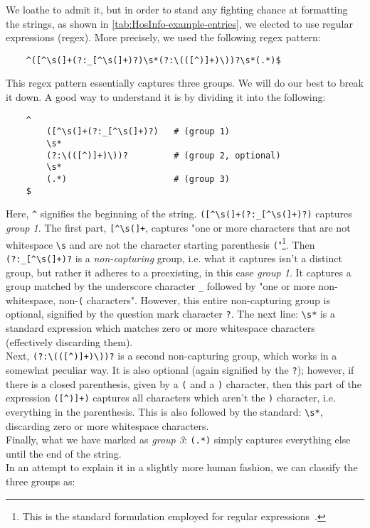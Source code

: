We loathe to admit it, but in order to stand any fighting chance at formatting the strings, as shown in \autoref{tab:HosInfo-example-entries}, we elected to use regular expressions (regex). More precisely, we used the following regex pattern:
\begin{verbatim}
    ^([^\s(]+(?:_[^\s(]+)?)\s*(?:\(([^)]+)\))?\s*(.*)$
\end{verbatim}
This regex pattern essentially captures three groups. We will do our best to break it down. A good way to understand it is by dividing it into the following:
\begin{verbatim}
    ^
        ([^\s(]+(?:_[^\s(]+)?)   # (group 1)
        \s*
        (?:\(([^)]+)\))?         # (group 2, optional)
        \s*
        (.*)                     # (group 3)
    $
\end{verbatim}
Here, \verb|^| signifies the beginning of the string. \verb|([^\s(]+(?:_[^\s(]+)?)| captures \emph{group 1}. The first part, \verb|[^\s(]+|, captures "one or more characters that are not whitespace \verb|\s| and are not the character starting parenthesis \verb|(|"\footnote{This is the standard formulation employed for regular expressions~\cite{Original-RegEx}.}. Then \verb|(?:_[^\s(]+)?| is a \emph{non-capturing} group, i.e. what it captures isn't a distinct group, but rather it adheres to a preexisting, in this case \emph{group 1}. It captures a group matched by the underscore character \verb|_| followed by "one or more non-whitespace, non-\verb|(| characters". However, this entire non-capturing group is optional, signified by the question mark character \verb|?|. The next line: \verb|\s*| is a standard expression which matches zero or more whitespace characters (effectively discarding them).
\\
Next, \verb|(?:\(([^)]+)\))?| is a second non-capturing group, which works in a somewhat peculiar way. It is also optional (again signified by the \verb|?|); however, if there is a closed parenthesis, given by a \verb|(| and a \verb|)| character, then this part of the expression \verb|([^)]+)| captures all characters which aren't the \verb|)| character, i.e. everything in the parenthesis. This is also followed by the standard: \verb|\s*|, discarding zero or more whitespace characters.
\\
Finally, what we have marked as \emph{group 3}: \verb|(.*)| simply captures everything else until the end of the string.
\\
In an attempt to explain it in a slightly more human fashion, we can classify the three groups as:
